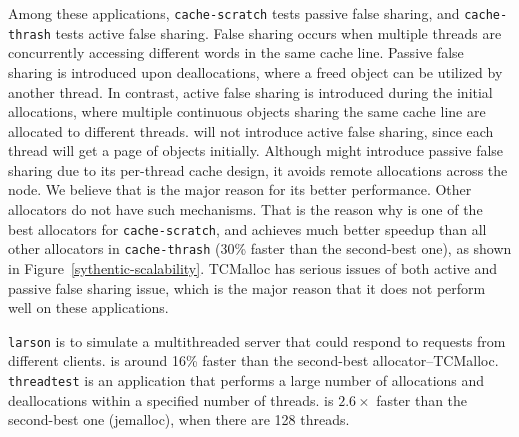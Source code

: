 Among these applications, \texttt{cache-scratch} tests passive false sharing, and \texttt{cache-thrash} tests active false sharing. False sharing occurs when multiple threads are concurrently accessing different words in the same cache line. 
Passive false sharing is introduced upon deallocations, where a freed object can be utilized by another thread. In contrast, active false sharing is introduced during the initial allocations, where multiple continuous objects sharing the same cache line are allocated to different threads. 
 \NM{} will not introduce active false sharing, since each thread will get a page of objects initially. Although \NM{} might introduce passive false sharing due to its per-thread cache design, it avoids remote allocations across the node. 
 We believe that is the major reason for its better performance. Other allocators do not have such mechanisms. 
 That is the reason why \NM{} is one of the best allocators for \texttt{cache-scratch}, and achieves much better speedup than all other allocators in \texttt{cache-thrash} (30\% faster than the second-best one), as shown in Figure~\ref{sythentic-scalability}. TCMalloc has serious issues of both active and passive false sharing issue, which is the major reason that it does not perform well on these applications.  
 
 \texttt{larson} is to simulate a multithreaded server that could respond to requests from different clients. \NM{} is around 16\% faster than the second-best allocator--TCMalloc.  
 \texttt{threadtest} is an application that performs a large number of allocations and deallocations within a specified number of threads. \NM{} is $2.6\times$ faster than the second-best one (jemalloc), when there are 128 threads.





